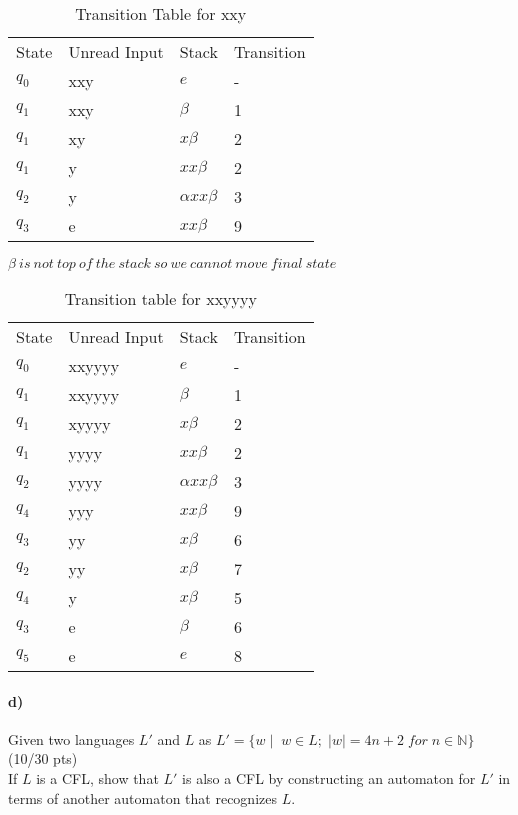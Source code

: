 \documentclass[a4paper,12pt]{article}
\begin{document}
\begin{tcolorbox}
\begin{table}[H]
\centering
\caption{Transition Table for xxy}
\label{my-label}
\begin{tabular}{llll}
State & Unread Input & Stack & Transition  \\
$q_0$ & xxy & $e$ & -  \\
$q_1$ & xxy & $\beta$ & 1   \\
$q_1$ & xy & $x\beta$ & 2   \\
$q_1$ & y & $xx\beta$ & 2   \\
$q_2$ & y & $\alpha xx\beta$ & 3  \\
$q_3$ & e & $xx\beta$ & 9  
\end{tabular}
\end{table}

$\beta\ is\ not\ top\ of\ the\ stack\ so\ we\ cannot\ move\ final\ state$

\begin{table}[H]
\centering
\caption{Transition table for xxyyyy}
\label{my-label}
\begin{tabular}{llll}
State & Unread Input & Stack & Transition  \\
$q_0$ & xxyyyy & $e$ & -   \\
$q_1$ & xxyyyy & $\beta$ & 1   \\
$q_1$ & xyyyy & $x\beta$ & 2   \\
$q_1$ & yyyy & $xx\beta$ & 2   \\
$q_2$ & yyyy & $\alpha xx\beta$ & 3   \\
$q_4$ & yyy & $xx\beta$ & 9   \\
$q_3$ & yy & $x\beta$ & 6   \\
$q_2$ & yy & $x\beta$ & 7   \\
$q_4$ & y & $x\beta$ & 5   \\
$q_3$ & e & $\beta$ & 6   \\
$q_5$ & e & $e$ & 8  
\end{tabular}
\end{table}

\end{tcolorbox}


\paragraph{d)} Given two languages $L'$ and $L$ as $L'=\{w \mid \; w\in L; \; |w|=4n+2 \; for\; n\in \mathbb{N} \}$
\hfill \small{(10/30 pts)} \\
If $L$ is a CFL, show that $L'$ is also a CFL by constructing an automaton for $L'$ in terms of another automaton that recognizes $L$. \\
\end{document}
